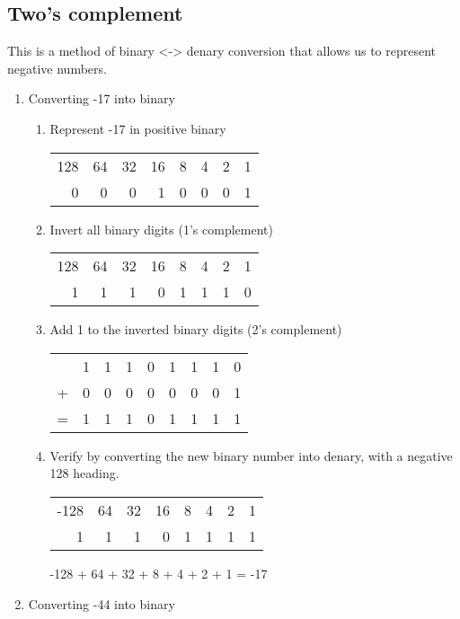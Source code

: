 \documentclass[11pt]{article}
\begin{document}
\subsection{Two's complement}
\label{sec:orgecc0b67}
This is a method of binary <-> denary conversion that allows us to represent negative numbers.
\begin{enumerate}
\item Converting -17 into binary
\begin{enumerate}
\item Represent -17 in positive binary
\begin{center}
\begin{tabular}{rrrrrrrr}
128 & 64 & 32 & 16 & 8 & 4 & 2 & 1\\
0 & 0 & 0 & 1 & 0 & 0 & 0 & 1\\
\end{tabular}
\end{center}
\item Invert all binary digits (1's complement)
\begin{center}
\begin{tabular}{rrrrrrrr}
128 & 64 & 32 & 16 & 8 & 4 & 2 & 1\\
1 & 1 & 1 & 0 & 1 & 1 & 1 & 0\\
\end{tabular}
\end{center}
\item Add 1 to the inverted binary digits (2's complement)
\begin{center}
\begin{tabular}{lrrrrrrrr}
 & 1 & 1 & 1 & 0 & 1 & 1 & 1 & 0\\
+ & 0 & 0 & 0 & 0 & 0 & 0 & 0 & 1\\
= & 1 & 1 & 1 & 0 & 1 & 1 & 1 & 1\\
\end{tabular}
\end{center}
\item Verify by converting the new binary number into denary, with a negative 128 heading.
\begin{center}
\begin{tabular}{rrrrrrrr}
-128 & 64 & 32 & 16 & 8 & 4 & 2 & 1\\
1 & 1 & 1 & 0 & 1 & 1 & 1 & 1\\
\end{tabular}
\end{center}
-128 + 64 + 32 + 8 + 4 + 2 + 1 = -17
\end{enumerate}
\item Converting -44 into binary

\end{enumerate}
\end{document}
